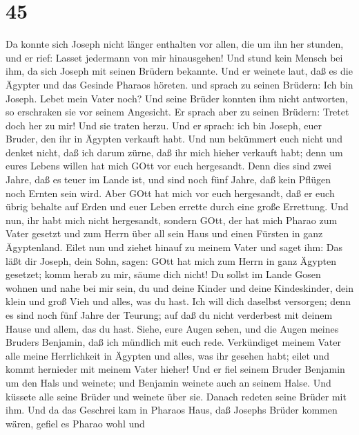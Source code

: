 \hypertarget{section-44}{%
\section{45}\label{section-44}}

 Da konnte sich Joseph nicht länger enthalten vor allen, die
um ihn her stunden, und er rief: Lasset jedermann von mir hinausgehen!
Und stund kein Mensch bei ihm, da sich Joseph mit seinen Brüdern
bekannte.  Und er weinete laut, daß es die Ägypter und das
Gesinde Pharaos höreten.  und sprach zu seinen Brüdern: Ich
bin Joseph. Lebet mein Vater noch? Und seine Brüder konnten ihm nicht
antworten, so erschraken sie vor seinem Angesicht.  Er
sprach aber zu seinen Brüdern: Tretet doch her zu mir! Und sie traten
herzu. Und er sprach: ich bin Joseph, euer Bruder, den ihr in Ägypten
verkauft habt.  Und nun bekümmert euch nicht und denket
nicht, daß ich darum zürne, daß ihr mich hieher verkauft habt; denn um
eures Lebens willen hat mich GOtt vor euch hergesandt.  Denn
dies sind zwei Jahre, daß es teuer im Lande ist, und sind noch fünf
Jahre, daß kein Pflügen noch Ernten sein wird.  Aber GOtt
hat mich vor euch hergesandt, daß er euch übrig behalte auf Erden und
euer Leben errette durch eine große Errettung.  Und nun, ihr
habt mich nicht hergesandt, sondern GOtt, der hat mich Pharao zum Vater
gesetzt und zum Herrn über all sein Haus und einen Fürsten in ganz
Ägyptenland.  Eilet nun und ziehet hinauf zu meinem Vater
und saget ihm: Das läßt dir Joseph, dein Sohn, sagen: GOtt hat mich zum
Herrn in ganz Ägypten gesetzet; komm herab zu mir, säume dich nicht!
 Du sollst im Lande Gosen wohnen und nahe bei mir sein, du
und deine Kinder und deine Kindeskinder, dein klein und groß Vieh und
alles, was du hast.  Ich will dich daselbst versorgen; denn
es sind noch fünf Jahre der Teurung; auf daß du nicht verderbest mit
deinem Hause und allem, das du hast.  Siehe, eure Augen
sehen, und die Augen meines Bruders Benjamin, daß ich mündlich mit euch
rede.  Verkündiget meinem Vater alle meine Herrlichkeit in
Ägypten und alles, was ihr gesehen habt; eilet und kommt hernieder mit
meinem Vater hieher!  Und er fiel seinem Bruder Benjamin um
den Hals und weinete; und Benjamin weinete auch an seinem Halse.
 Und küssete alle seine Brüder und weinete über sie. Danach
redeten seine Brüder mit ihm.  Und da das Geschrei kam in
Pharaos Haus, daß Josephs Brüder kommen wären, gefiel es Pharao wohl und
